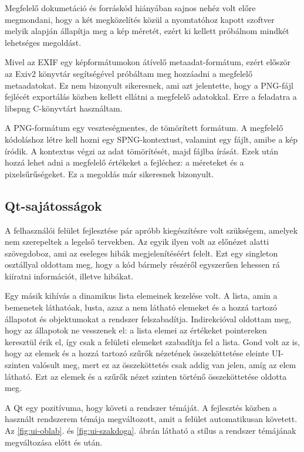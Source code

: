 Megfelelő dokumetáció és forráskód hiányában sajnos nehéz volt előre megmondani, hogy a két megközelítés közül a nyomtatóhoz kapott szoftver melyik alapján állapítja meg a kép méretét, ezért ki kellett próbálnom mindkét lehetséges megoldást.

Mivel az EXIF egy képformátumokon átívelő metaadat-formátum, ezért először az Exiv2 könyvtár segítségével próbáltam meg hozzáadni a megfelelő metaadatokat. Ez nem bizonyult sikeresnek, ami azt jelentette, hogy a PNG-fájl fejlécét exportálás közben kellett ellátni a megfelelő adatokkal. Erre a feladatra a libspng C-könyvtárt használtam.

A PNG-formátum egy veszteségmentes, de tömörített formátum. A megfelelő kódoláshoz létre kell hozni egy SPNG-kontextust, valamint egy fájlt, amibe a kép íródik. A kontextus végzi az adat tömörítését, majd fájlba írását. Ezek után hozzá lehet adni a megfelelő értékeket a fejléchez: a méreteket és a pixelsűrűségeket.
Ez a megoldás már sikeresnek bizonyult.

\subsection{Qt-sajátosságok}

A felhasználói felület fejlesztése pár apróbb kiegészítésre volt szükségem, amelyek nem szerepeltek a legelső tervekben. Az egyik ilyen volt az előnézet alatti szövegdoboz, ami az eseleges hibák megjelenítéséért felelt. 
Ezt egy singleton osztállyal oldottam meg, hogy a kód bármely részéről egyszerűen lehessen rá kiíratni információt, illetve hibákat.

Egy másik kihívás a dinamikus lista elemeinek kezelése volt. A lista, amin a bemenetek láthatóak, lusta, azaz a nem látható elemeket és a hozzá tartozó állapotot és objektumokat a rendszer felszabadítja. Indirekcióval oldottam meg, hogy az állapotok ne vesszenek el: a lista elemei az értékeket pointereken keresztül érik el, így csak a felületi elemeket szabadítja fel a lista. Gond volt az is, hogy az elemek és a hozzá tartozó szűrők nézetének összeköttetése eleinte UI-szinten valósult meg, mert ez az összeköttetés csak addig van jelen, amíg az elem látható. Ezt az elemek és a szűrők nézet szinten történő összeköttetése oldotta meg.

A Qt egy pozitívuma, hogy követi a rendszer témáját. A fejlesztés közben a használt rendszerem témája megváltozott, amit a felület automatikusan követett. Az \ref{fig:ui-oblab}. és \ref{fig:ui-szakdoga}. ábrán látható a stílus a rendszer témájának megváltozása előtt és után.

